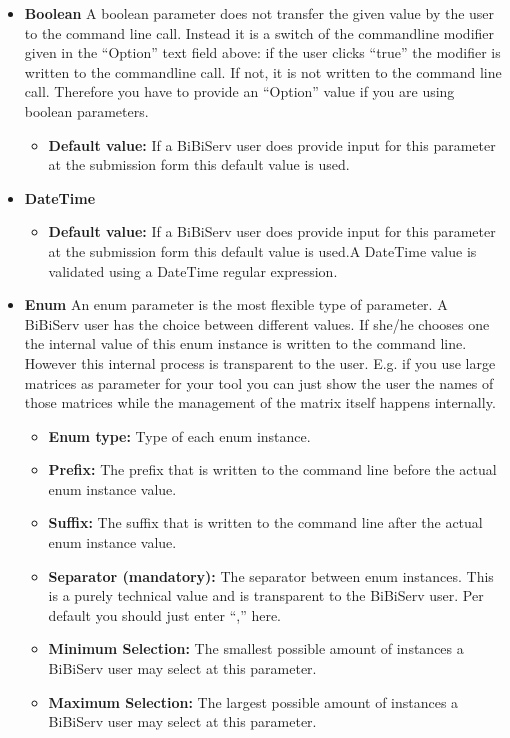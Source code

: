 \documentclass[a4paper,10pt]{book}
\newcommand{\defaultValue}{\textbf{Default value:} If a BiBiServ user does provide input for this parameter at the submission form this default value is used.}
\begin{document}
\begin{itemize}
\begin{itemize}
	\item \textbf{Maximum included:} If activated the user can use the maximum value. If not the user can only use values smaller than the minimum value.
	\end{itemize}
 \item \textbf{Boolean}
	A boolean parameter does not transfer the given value by the user to the command line call. Instead it is a switch of the commandline modifier given in the ``Option'' text field above: if the user clicks ``true'' the modifier is written to the commandline call. If not, it is not written to the command line call. Therefore you have to provide an ``Option'' value if you are using boolean parameters.
	\begin{itemize}
	\item \defaultValue
	\end{itemize}
 \item \textbf{DateTime}
	\begin{itemize}
	\item \defaultValue A DateTime value is validated using a DateTime regular expression.
	\end{itemize}
 \item \textbf{Enum}
	An enum parameter is the most flexible type of parameter. A BiBiServ user has the choice between different values. If she/he chooses one the internal value of this enum instance is written to the command line. However this internal process is transparent to the user. E.g. if you use large matrices as parameter for your tool you can just show the user the names of those matrices while the management of the matrix itself happens internally.
	\begin{itemize}
	\item \textbf{Enum type:} Type of each enum instance.
	\item \textbf{Prefix:} The prefix that is written to the command line before the actual enum instance value.
	\item \textbf{Suffix:} The suffix that is written to the command line after the actual enum instance value.
	\item \textbf{Separator (mandatory):} The separator between enum instances. This is a purely technical value and is transparent to the BiBiServ user. Per default you should just enter ``,'' here.
	\item \textbf{Minimum Selection:} The smallest possible amount of instances a BiBiServ user may select at this parameter.
	\item \textbf{Maximum Selection:} The largest possible amount of instances a BiBiServ user may select at this parameter.

\end{itemize}
\end{itemize}
\end{document}
